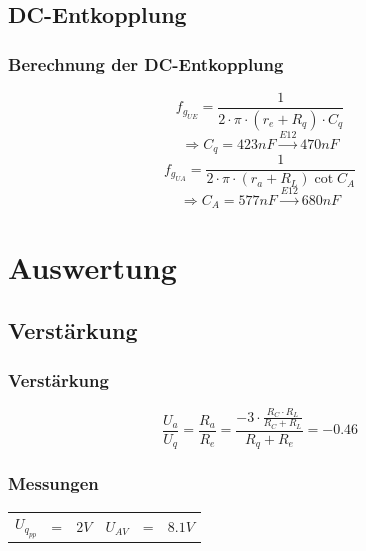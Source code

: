 \subsection{DC-Entkopplung}
\begin{frame}
	\frametitle{Berechnung der DC-Entkopplung}
	\[ f_{g_{UE}} = \frac{1}{2 \cdot \pi \cdot (r_e + R_q) \cdot C_q} \]
	\[ \Rightarrow C_q = 423nF \xrightarrow{E12} 470nF \]
	\[ f_{g_{UA}} = \frac{1}{2 \cdot \pi \cdot (r_a + R_L) \cot C_A} \]
	\[ \Rightarrow C_A = 577nF \xrightarrow{E12} 680nF \]
\end{frame}

\section{Auswertung}
\subsection{Verstärkung}
\begin{frame}
	\frametitle{Verstärkung}
	\[ \frac{U_a}{U_q} = \frac{R_a}{R_e} = 
		\frac{-3 \cdot \frac{R_C \cdot R_L}{R_C + R_L}}{R_q + R_e} 
		= -0.46 \]
\end{frame}

\begin{frame}
	\frametitle{Messungen}
	\begin{table}
		\centering
		\begin{tabular}{l c l l c l}
			$U_{q_{pp}}$ & = & $2V$ & $U_{AV}$ & = & $8.1V$ \\
		\end{tabular}
	\end{table}
\end{frame}
